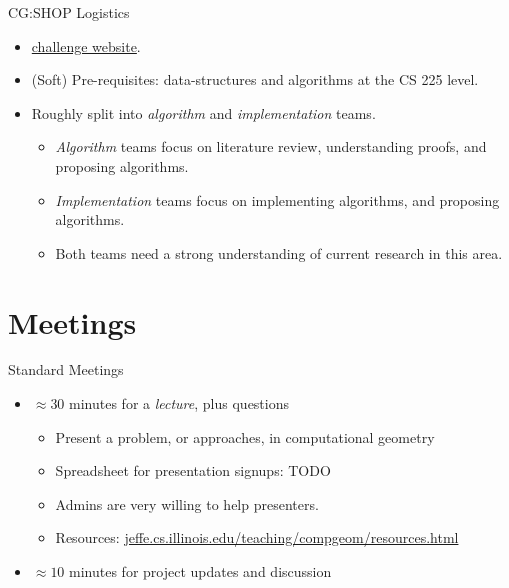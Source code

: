 \documentclass[aspectratio=169]{beamer}
\begin{document}
\begin{frame}{CG:SHOP Logistics}
    \begin{itemize}
        \item \href{https://cgshop.ibr.cs.tu-bs.de/competition/cg-shop-2027/}{challenge website}.
        \item (Soft) Pre-requisites: data-structures and algorithms at the CS 225 level.
        \item Roughly split into \textit{algorithm} and \textit{implementation} teams.
              \begin{itemize}
                  \item \textit{Algorithm} teams focus on literature review, understanding proofs, and proposing algorithms.
                  \item \textit{Implementation} teams focus on implementing algorithms, and proposing algorithms.
                  \item Both teams need a strong understanding of current research in this area.
              \end{itemize}
    \end{itemize}
\end{frame}

\section{Meetings}
\frame{\sectionpage}

\begin{frame}{Standard Meetings}
    \begin{itemize}
        \item $\approx 30$ minutes for a \emph{lecture}, plus questions
              \begin{itemize}
                  \item Present a problem, or approaches, in computational geometry
                  \item Spreadsheet for presentation signups: TODO
                  \item Admins are very willing to help presenters.
                  \item Resources: \href{https://jeffe.cs.illinois.edu/teaching/compgeom/resources.html}{jeffe.cs.illinois.edu/teaching/compgeom/resources.html}
              \end{itemize}
        \item $\approx 10$ minutes for project updates and discussion
    \end{itemize}
\end{frame}
\end{document}

